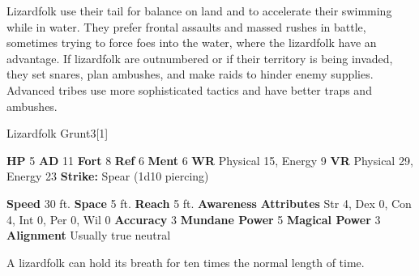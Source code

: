       Lizardfolk use their tail for balance on land and to accelerate their swimming while in water.
      They prefer frontal assaults and massed rushes in battle, sometimes trying to force foes into the water, where the lizardfolk have an advantage.
      If lizardfolk are outnumbered or if their territory is being invaded, they set snares, plan ambushes, and make raids to hinder enemy supplies.
      Advanced tribes use more sophisticated tactics and have better traps and ambushes.
    

      
  \begin{monsubsection}{Lizardfolk Grunt}{3}[1]
    \vspace{-1em}\vspace{-1em}
    \vspace{0em}

    
    

    \begin{spellcontent}
      \begin{spelltargetinginfo}
        \pari \textbf{HP} 5 \monsep
          \textbf{AD} 11 \monsep
          \textbf{Fort} 8 \monsep
          \textbf{Ref} 6 \monsep
          \textbf{Ment} 6
        \pari \textbf{WR} Physical 15, Energy 9 \monsep
        \textbf{VR} Physical 29, Energy 23
        \pari \textbf{Strike:}
            Spear  (1d10 piercing)
      \end{spelltargetinginfo}
    \end{spellcontent}
    \begin{monsterfooter}
      \pari \textbf{Speed} 30 ft. \monsep
        \textbf{Space} 5 ft. \monsep
        \textbf{Reach} 5 ft.
      \pari \textbf{Awareness} 
      \pari \textbf{Attributes}
        Str 4, Dex 0,
        Con 4, Int 0,
        Per 0, Wil 0
      \pari \textbf{Accuracy} 3 \monsep
        \textbf{Mundane Power} 5 \monsep
      \textbf{Magical Power} 3
      \pari \textbf{Alignment} Usually true neutral
    \end{monsterfooter}
  \end{monsubsection}
   A lizardfolk can hold its breath for ten times the normal length of time.
  

